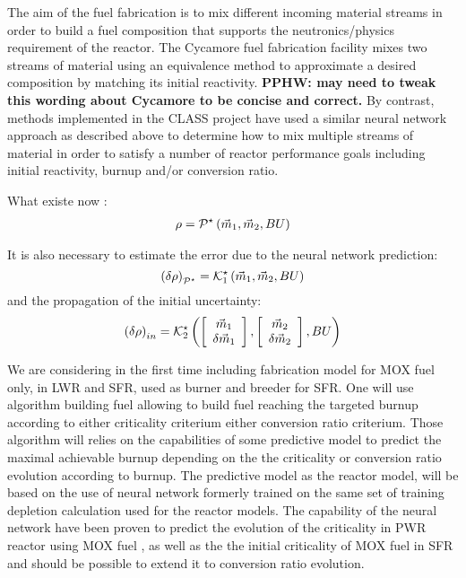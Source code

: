 \documentclass[dvips,12pt]{article}
\newcommand{\unc}[1]
{ \delta #1 }
\newcommand{\uncvector}[1]
{ \left[ \begin{array}{c} #1 \\ \delta #1 \end{array} \right] }
\newcommand{\comment}[1]
{{\bfseries \color{red} #1}}
\begin{document}
The aim of the fuel fabrication is to mix
different incoming material streams in order to
build a fuel composition that supports the
neutronics/physics requirement of the reactor. The
Cycamore fuel fabrication facility mixes two
streams of material using an equivalence method to
approximate a desired composition by matching its
initial reactivity.  \cite{cycamore_fab}
\comment{PPHW: may need to tweak this wording
  about Cycamore to be concise and correct.}  By
contrast, methods implemented in the CLASS project
have used a similar neural network approach as
described above to determine how to mix multiple
streams of material in order to satisfy a number
of reactor performance goals including initial
reactivity, burnup and/or conversion ratio.


What existe now :
\begin{align}
  \rho &= {\cal P^{\star}}\left( \vec{m}_{1},\vec{m}_{2}, BU \right)\\
\end{align}

It is also necessary to estimate the error due to
the neural network prediction:
\begin{equation}
  \left(\unc{\rho}\right)_{\cal P^\star} = {\cal K}_1^{\star}\left( \vec{m}_{1},\vec{m}_{2}, BU \right)
\end{equation}
and the propagation of the initial uncertainty:
\begin{equation}
  \left(\unc{\rho}\right)_{in} = {\cal K}^{\star}_2\left( \uncvector{\vec{m}_{1}},\uncvector{\vec{m}_{2}}, BU \right)
\end{equation}


We are considering in the first time including
fabrication model for MOX fuel only, in LWR and
SFR, used as burner and breeder for SFR. One will
use algorithm building fuel allowing to build fuel
reaching the targeted burnup according to either
criticality criterium either conversion ratio
criterium.  Those algorithm will relies on the
capabilities of some predictive model to predict
the maximal achievable burnup depending on the the
criticality or conversion ratio evolution
according to burnup.  The predictive model as the
reactor model, will be based on the use of neural
network formerly trained on the same set of
training depletion calculation used for the
reactor models. The capability of the neural
network have been proven to predict the evolution
of the criticality in PWR reactor using MOX fuel
\cite{Leniaux.NN, CLASS_UserManual}, as well as
the the initial criticality of MOX fuel in SFR
\cite{CLASS UserManual} and should be possible to
extend it to conversion ratio evolution.
\end{document}
